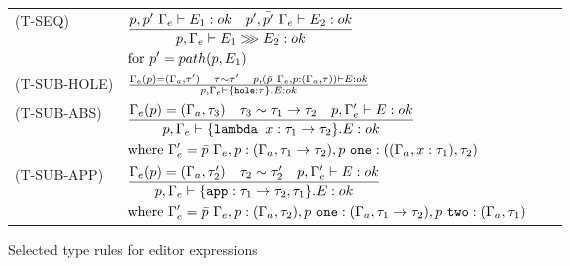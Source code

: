 \begin{figure*}
  \center
  \renewcommand{\arraystretch}{2}
  \begin{tabular}{llll}
    \scriptsize(T-SEQ)       & \scriptsize$\TSeq$ & &\\
    \scriptsize(T-SUB-HOLE)  & $\TSubHole$ & &           \\
    \scriptsize(T-SUB-ABS)   & \scriptsize$\TSubAbs$   & & \\
    \scriptsize(T-SUB-APP)   & \scriptsize$ \TSubApp$ & & \\
  \end{tabular}
  \caption{Selected type rules for editor expressions}
  \label{fig:edttyperules}
\end{figure*}

